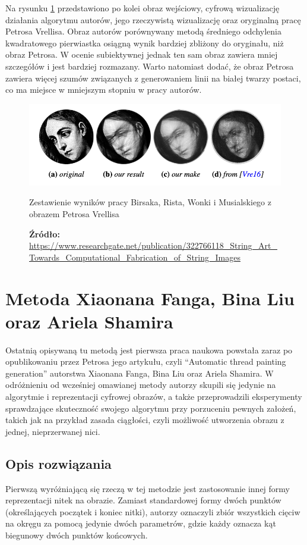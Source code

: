         Na rysunku \ref{others-birsak-output} przedstawiono po kolei obraz wejściowy, cyfrową wizualizację działania algorytmu autorów, jego rzeczywistą wizualizację oraz oryginalną pracę Petrosa Vrellisa. Obraz autorów porównywany metodą średniego odchylenia kwadratowego pierwiastka osiągną wynik bardziej zbliżony do oryginału, niż obraz Petrosa. W ocenie subiektywnej jednak ten sam obraz zawiera mniej szczegółów i jest bardziej rozmazany. Warto natomiast dodać, że obraz Petrosa zawiera więcej szumów związanych z generowaniem linii na białej twarzy postaci, co ma miejsce w mniejszym stopniu w pracy autorów.
        \begin{figure}[H]
            \centering
            \includegraphics[width=\textwidth,keepaspectratio]{img/3-others/birsak-vs-petros.png}
            \caption{Zestawienie wyników pracy Birsaka, Rista, Wonki i Musialskiego z obrazem Petrosa Vrellisa}
            \caption*{\footnotesize{\textbf{Źródło:} {\url{https://www.researchgate.net/publication/322766118_String_Art_Towards_Computational_Fabrication_of_String_Images}}}}
            \label{others-birsak-output}
        \end{figure}

    \section{Metoda Xiaonana Fanga, Bina Liu oraz Ariela Shamira} \label{others-xiao}
    Ostatnią opisywaną tu metodą jest pierwsza praca naukowa powstała zaraz po opublikowaniu przez Petrosa jego artykułu, czyli ``Automatic thread painting generation'' autorstwa Xiaonana Fanga, Bina Liu oraz Ariela Shamira. W odróżnieniu od wcześniej omawianej metody autorzy skupili się jedynie na algorytmie i reprezentacji cyfrowej obrazów, a także przeprowadzili eksperymenty sprawdzające skuteczność swojego algorytmu przy porzuceniu pewnych założeń, takich jak na przykład zasada ciągłości, czyli możliwość utworzenia obrazu z jednej, nieprzerwanej nici.
    
        \subsection{Opis rozwiązania}
        Pierwszą wyróżniającą się rzeczą w tej metodzie jest zastosowanie innej formy reprezentacji nitek na obrazie. Zamiast standardowej formy dwóch punktów (określających początek i koniec nitki), autorzy oznaczyli zbiór wszystkich cięciw na okręgu za pomocą jedynie dwóch parametrów, gdzie każdy oznacza kąt biegunowy dwóch punktów końcowych.
        
